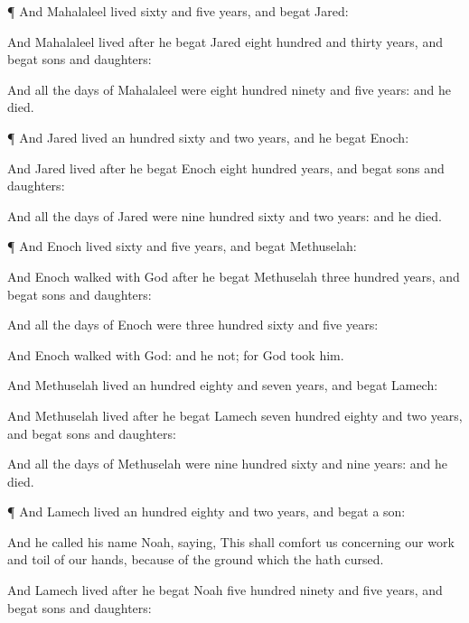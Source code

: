{\par }{\PP {}¶ And
Mahalaleel
lived
sixty and
five
years, and
begat
Jared:

And
Mahalaleel
lived
after he
begat
Jared
eight
hundred and
thirty
years, and
begat
sons and
daughters:

And all the
days of
Mahalaleel were
eight
hundred
ninety and
five
years: and he
died.


\par }{\PP {}¶ And
Jared
lived an
hundred
sixty and
two
years, and he
begat
Enoch:

And
Jared
lived
after he
begat
Enoch
eight
hundred
years, and
begat
sons and
daughters:

And all the
days of
Jared were
nine
hundred
sixty and
two
years: and he
died.


\par }{\PP {}¶ And
Enoch
lived
sixty and
five
years, and
begat
Methuselah:

And
Enoch
walked
with
God
after he
begat
Methuselah
three
hundred
years, and
begat
sons and
daughters:

And all the
days of
Enoch were
three
hundred
sixty and
five
years:

And
Enoch
walked with
God: and he
{} not; for
God
took him.


\par }{\PP {}And
Methuselah
lived an
hundred
eighty and
seven
years, and
begat
Lamech:

And
Methuselah
lived
after he
begat
Lamech
seven
hundred
eighty and
two
years, and
begat
sons and
daughters:

And all the
days of
Methuselah were
nine
hundred
sixty and
nine
years: and he
died.


\par }{\PP {}¶ And
Lamech
lived an
hundred
eighty and
two
years, and
begat a
son:

And he
called his
name
Noah,
saying, This
{} shall
comfort us concerning our
work and
toil of our
hands,
because of the
ground which the
{} hath
cursed.

And
Lamech
lived
after he
begat
Noah
five
hundred
ninety and
five
years, and
begat
sons and
daughters:

}
